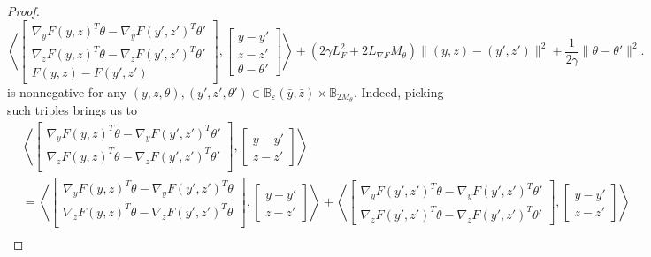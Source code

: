 \documentclass[11pt,a4paper]{article}
\theoremstyle{plain}
\begin{document}
\begin{proof}
\begin{equation}\label{thm_proxreg_eq1}
\left\langle \begin{bmatrix}
\nabla_y F(y,z)^T\theta - \nabla_y F(y',z')^T \theta' \\  
\nabla_z F(y,z)^T\theta - \nabla_z F(y',z')^T \theta' \\  
F(y,z) - F(y',z')
\end{bmatrix},
\begin{bmatrix}
y - y' \\ z-z' \\\theta - \theta'  
\end{bmatrix} \right\rangle + (2\gamma L_F^2 + 2L_{\nabla F}M_\theta)
\|(y,z) - (y',z')\|^2
+ \frac{1}{2\gamma}\|\theta - \theta'\|^2.
\end{equation}
is nonnegative for any $(y,z,\theta), (y',z',\theta') \in \mathbb{B}_{\varepsilon}(\bar{y}, \bar{z}) \times \mathbb{B}_{ 2M_{\theta}}$. Indeed, picking such triples brings us to 
\begin{equation*}
\begin{aligned}
&\left\langle 
\begin{bmatrix}
\nabla_y F(y,z)^T\theta - \nabla_y F(y',z')^T \theta' \\  
\nabla_z F(y,z)^T\theta - \nabla_z F(y',z')^T \theta' \\  
\end{bmatrix},
\begin{bmatrix}
y - y' \\ z-z' 
\end{bmatrix} \right\rangle \\
&=\left\langle
\begin{bmatrix}
\nabla_y F(y,z)^T\theta - \nabla_y F(y',z')^T \theta \\  
\nabla_z F(y,z)^T\theta - \nabla_z F(y',z')^T \theta \\  
\end{bmatrix},
\begin{bmatrix}
y - y' \\ z-z' 
\end{bmatrix} \right\rangle + \left\langle 
\begin{bmatrix}
\nabla_y F(y',z')^T\theta - \nabla_y F(y',z')^T\theta' \\
\nabla_z F(y',z')^T\theta - \nabla_z F(y',z')^T\theta'
\end{bmatrix},
\begin{bmatrix}
y - y' \\ z-z' 
\end{bmatrix} \right\rangle\\

\end{aligned}
\end{equation*}
\end{proof}
\end{document}
